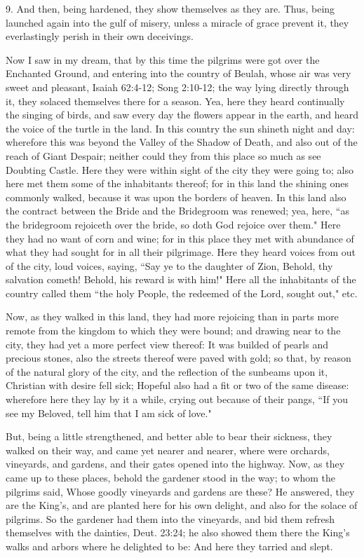 9. And then, being hardened, they show themselves as they are. Thus, being launched again into the gulf of misery, unless a miracle of grace prevent it, they everlastingly perish in their own deceivings.

Now I saw in my dream, that by this time the pilgrims were got over the Enchanted Ground, and entering into the country of Beulah, whose air was very sweet and pleasant, Isaiah 62:4-12; Song 2:10-12; the way lying directly through it, they solaced themselves there for a season. Yea, here they heard continually the singing of birds, and saw every day the flowers appear in the earth, and heard the voice of the turtle in the land. In this country the sun shineth night and day: wherefore this was beyond the Valley of the Shadow of Death, and also out of the reach of Giant Despair; neither could they from this place so much as see Doubting Castle. Here they were within sight of the city they were going to; also here met them some of the inhabitants thereof; for in this land the shining ones commonly walked, because it was upon the borders of heaven. In this land also the contract between the Bride and the Bridegroom was renewed; yea, here, ``as the bridegroom rejoiceth over the bride, so doth God rejoice over them." Here they had no want of corn and wine; for in this place they met with abundance of what they had sought for in all their pilgrimage. Here they heard voices from out of the city, loud voices, saying, ``Say ye to the daughter of Zion, Behold, thy salvation cometh! Behold, his reward is with him!" Here all the inhabitants of the country called them ``the holy People, the redeemed of the Lord, sought out," etc.

Now, as they walked in this land, they had more rejoicing than in parts more remote from the kingdom to which they were bound; and drawing near to the city, they had yet a more perfect view thereof: It was builded of pearls and precious stones, also the streets thereof were paved with gold; so that, by reason of the natural glory of the city, and the reflection of the sunbeams upon it, Christian with desire fell sick; Hopeful also had a fit or two of the same disease: wherefore here they lay by it a while, crying out because of their pangs, ``If you see my Beloved, tell him that I am sick of love."

But, being a little strengthened, and better able to bear their sickness, they walked on their way, and came yet nearer and nearer, where were orchards, vineyards, and gardens, and their gates opened into the highway. Now, as they came up to these places, behold the gardener stood in the way; to whom the pilgrims said, Whose goodly vineyards and gardens are these? He answered, they are the King's, and are planted here for his own delight, and also for the solace of pilgrims. So the gardener had them into the vineyards, and bid them refresh themselves with the dainties, Deut. 23:24; he also showed them there the King's walks and arbors where he delighted to be: And here they tarried and slept.


